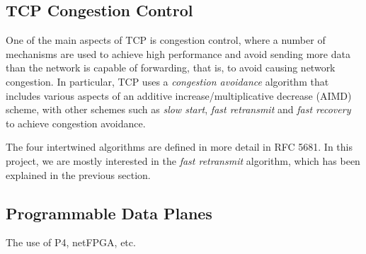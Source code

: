 	\subsection{TCP Congestion Control}
	One of the main aspects of TCP is congestion control, where a number of mechanisms are used to achieve high performance and avoid sending more data than the network is capable of forwarding, that is, to avoid causing network congestion. In particular, TCP uses a \textit{congestion avoidance} algorithm that includes various aspects of an additive increase/multiplicative decrease (AIMD) scheme, with other schemes such as \textit{slow start}, \textit{fast retransmit} and \textit{fast recovery} to achieve congestion avoidance. 
	
	The four intertwined algorithms are defined in more detail in RFC 5681\cite{rfc5681}. In this project, we are mostly interested in the \textit{fast retransmit} algorithm, which has been explained in the previous section.
	
	\subsection{Programmable Data Planes}
	The use of P4, netFPGA, etc.

